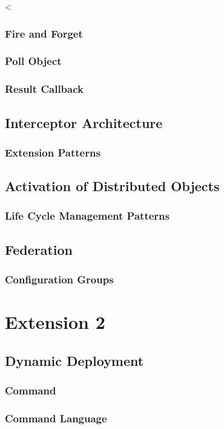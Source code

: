 <\documentclass[a4paper]{article}
\begin{document}
\subsubsection{Fire and Forget}
\subsubsection{Poll Object}
\subsubsection{Result Callback}

\subsection{Interceptor Architecture}
\subsubsection{Extension Patterns}

\subsection{Activation of Distributed Objects}
\subsubsection{Life Cycle Management Patterns}

\subsection{Federation}
\subsubsection{Configuration Groups}

\section{Extension 2}
\subsection{Dynamic Deployment}
\subsubsection{Command}
\subsubsection{Command Language}
\end{document}
